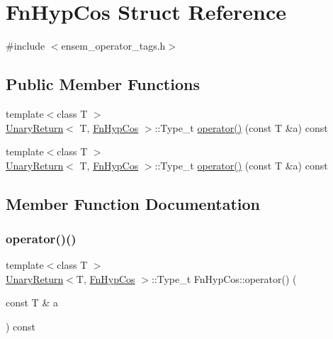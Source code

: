 \hypertarget{structFnHypCos}{}\section{Fn\+Hyp\+Cos Struct Reference}
\label{structFnHypCos}


{\ttfamily \#include $<$ensem\+\_\+operator\+\_\+tags.\+h$>$}

\subsection*{Public Member Functions}
\begin{DoxyCompactItemize}
\item 
{\footnotesize template$<$class T $>$ }\\\mbox{\hyperlink{structUnaryReturn}{Unary\+Return}}$<$ T, \mbox{\hyperlink{structFnHypCos}{Fn\+Hyp\+Cos}} $>$\+::Type\+\_\+t \mbox{\hyperlink{structFnHypCos_ab6e05ff6650f0719ca08b86905fba763}{operator()}} (const T \&a) const
\item 
{\footnotesize template$<$class T $>$ }\\\mbox{\hyperlink{structUnaryReturn}{Unary\+Return}}$<$ T, \mbox{\hyperlink{structFnHypCos}{Fn\+Hyp\+Cos}} $>$\+::Type\+\_\+t \mbox{\hyperlink{structFnHypCos_ab6e05ff6650f0719ca08b86905fba763}{operator()}} (const T \&a) const
\end{DoxyCompactItemize}


\subsection{Member Function Documentation}
\mbox{\label{structFnHypCos_ab6e05ff6650f0719ca08b86905fba763}} 
\subsubsection{\texorpdfstring{operator()()}{operator()()}\hspace{0.1cm}{\footnotesize\ttfamily [1/2]}}
{\footnotesize\ttfamily template$<$class T $>$ \\
\mbox{\hyperlink{structUnaryReturn}{Unary\+Return}}$<$T, \mbox{\hyperlink{structFnHypCos}{Fn\+Hyp\+Cos}} $>$\+::Type\+\_\+t Fn\+Hyp\+Cos\+::operator() (\begin{DoxyParamCaption}\item[{const T \&}]{a }\end{DoxyParamCaption}) const\hspace{0.3cm}{\ttfamily [inline]}}

